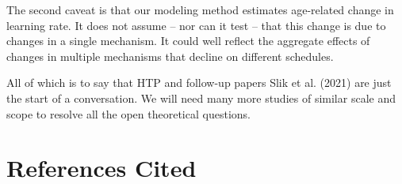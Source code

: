 \documentclass[
  english,
  doc,floatsintext]{apa6}
\begin{document}
The second caveat is that our modeling method estimates age-related change in learning rate. It does not assume -- nor can it test -- that this change is due to changes in a single mechanism. It could well reflect the aggregate effects of changes in multiple mechanisms that decline on different schedules.

All of which is to say that HTP and follow-up papers Slik et al. (2021) are just the start of a conversation. We will need many more studies of similar scale and scope to resolve all the open theoretical questions.

\clearpage

\hypertarget{references-cited}{%
\section*{References Cited}\label{references-cited}}
\end{document}
